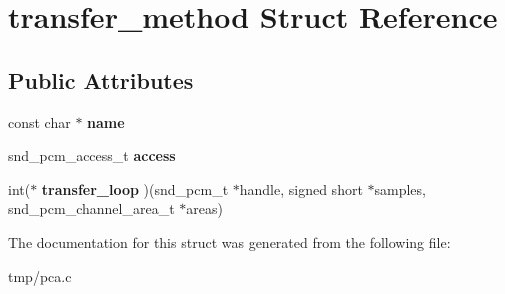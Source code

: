 \hypertarget{structtransfer__method}{\section{transfer\-\_\-method \-Struct \-Reference}
\label{structtransfer__method}
}
\subsection*{\-Public \-Attributes}
\begin{DoxyCompactItemize}
\item 
\hypertarget{structtransfer__method_ade4fd1bcae8a34655ddb67df7c70bbfb}{const char $\ast$ {\bfseries name}}\label{structtransfer__method_ade4fd1bcae8a34655ddb67df7c70bbfb}

\item 
\hypertarget{structtransfer__method_aad985b0476a282d6795bc60d8ad01e6d}{snd\-\_\-pcm\-\_\-access\-\_\-t {\bfseries access}}\label{structtransfer__method_aad985b0476a282d6795bc60d8ad01e6d}

\item 
\hypertarget{structtransfer__method_a50b7e6311899e7bd87d78e92aa905990}{int($\ast$ {\bfseries transfer\-\_\-loop} )(snd\-\_\-pcm\-\_\-t $\ast$handle, signed short $\ast$samples, snd\-\_\-pcm\-\_\-channel\-\_\-area\-\_\-t $\ast$areas)}\label{structtransfer__method_a50b7e6311899e7bd87d78e92aa905990}

\end{DoxyCompactItemize}


\-The documentation for this struct was generated from the following file\-:\begin{DoxyCompactItemize}
\item 
tmp/pca.\-c\end{DoxyCompactItemize}
